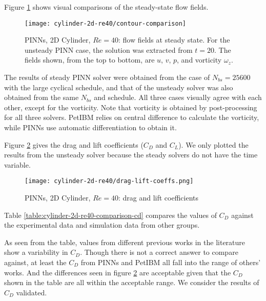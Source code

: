 Figure \ref{fig:cylinder-2d-re40-contours} shows visual comparisons of the steady-state flow fields.
\begin{figure}[hbt!]
    \texttt{[image: cylinder-2d-re40/contour-comparison]}
    \caption[%
        PINNs, 2D Cylinder, $Re=40$: flow fields at steady state%
    ]{%
        PINNs, 2D Cylinder, $Re=40$: flow fields at steady state. %
        For the unsteady PINN case, the solution was extracted from $t=20$. %
        The fields shown, from the top to bottom, are $u$, $v$, $p$, and vorticity $\omega_z$.%
    }%
    \label{fig:cylinder-2d-re40-contours}
\end{figure}
The results of steady PINN solver were obtained from the case of $N_{bs}=\num{25600}$ with the large cyclical schedule, and that of the unsteady solver was also obtained from the same $N_{bs}$ and schedule.
All three cases visually agree with each other, except for the vorticity.
Note that vorticity is obtained by post-processing for all three solvers.
PetIBM relies on central difference to calculate the vorticity, while PINNs use automatic differentiation to obtain it.

Figure \ref{fig:cylinder-2d-re40-drag-lift-time} gives the drag and lift coefficients ($C_D$ and $C_L$).
We only plotted the results from the unsteady solver because the steady solvers do not have the time variable. 
\begin{figure}[hbt!]
    \texttt{[image: cylinder-2d-re40/drag-lift-coeffs.png]}
    \caption[%
        PINNs, 2D Cylinder, $Re=40$: drag and lift coefficients%
    ]{%
        PINNs, 2D Cylinder, $Re=40$: drag and lift coefficients%
    }%
    \label{fig:cylinder-2d-re40-drag-lift-time}
\end{figure}
Table \ref{table:cylinder-2d-re40-comparison-cd} compares the values of $C_D$ against the experimental data and simulation data from other groups.

As seen from the table, values from different previous works in the literature show a variability in $C_D$.
Though there is not a correct answer to compare against, at least the $C_D$ from PINNs and PetIBM all fall into the range of others' works.
And the differences seen in figure \ref{fig:cylinder-2d-re40-drag-lift-time} are acceptable given that the $C_D$ shown in the table are all within the acceptable range.
We consider the results of $C_D$ validated.

